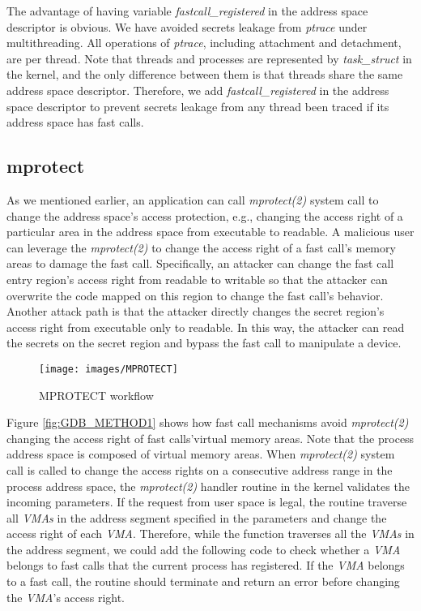 The advantage of having variable \emph{fastcall\_registered} in the address space 
 descriptor is obvious.  We have avoided secrets leakage from \emph{ptrace} under 
 multithreading. All operations of \emph{ptrace}, including attachment and detachment, 
 are per thread. Note that threads and processes are represented by \emph{task\_struct}
 in the kernel, and the only difference between them is that threads share 
the same address space descriptor. Therefore, we add \emph{fastcall\_registered} 
in the address space descriptor to prevent secrets leakage from any thread 
been traced if its address space has fast calls.


\subsection{mprotect}
As we mentioned earlier, an application can call \emph{mprotect(2)}  
system call\cite{19} to change the address space's access protection, 
e.g., changing the access right of a particular area in the address 
space from executable to readable.  A malicious user can leverage the 
\emph{mprotect(2)} to change the access right of a fast call's memory areas to 
damage the fast call. Specifically, an attacker can change the fast 
call entry region's access right from readable to writable so that the attacker can overwrite 
the code mapped on this region to change the fast call's behavior. 
Another attack path is that the attacker directly changes the secret 
region's access right from executable only to readable. In this way, 
the attacker can read the secrets on the secret region and bypass the 
fast call to manipulate a device.
\begin{figure}[H]
  \centering
  \texttt{[image: images/MPROTECT]}
  \caption[MPROTECT workflow]{MPROTECT workflow}
  \label{fig:MPROTECT}
\end{figure}

Figure \ref{fig:GDB_METHOD1} shows how fast call mechanisms avoid \emph{mprotect(2)} 
changing the access right of fast calls'virtual memory areas. 
Note that the process address space\cite{10.5555/983550} is composed of virtual memory areas\cite{10.5555/983550}.  
When \emph{mprotect(2)} system call is called to change the access rights on a 
consecutive address range in the process address space, the \emph{mprotect(2)} 
handler routine in the kernel validates the incoming parameters. 
If the request from user space is legal, the routine 
traverse all \emph{VMAs} in the address segment specified in the parameters
 and change the access right of each \emph{VMA}. Therefore, while the function 
 traverses all the \emph{VMAs} in the address segment, we could add the following 
 code to check whether a \emph{VMA} belongs to fast calls that the current process 
 has registered. If the \emph{VMA} belongs to a fast call, the routine 
 should terminate and return an error before changing the \emph{VMA}'s access right.

